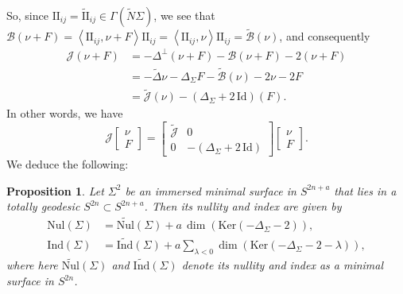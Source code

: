 \documentclass[11pt]{article}
\newcommand{\Ker}{\mathrm{Ker}}
\newtheorem{prop}[thm]{Proposition}
\theoremstyle{definition}
\numberwithin{equation}{section}
\begin{document}
So, since $\mathrm{I\!I}_{ij} = \widetilde{\mathrm{I\!I}}_{ij}  \in \Gamma(\widetilde{N}\Sigma)$, we see that $\mathscr{B}(\nu + F) = \left\langle \mathrm{I\!I}_{ij}, \nu + F \right\rangle \mathrm{I\!I}_{ij} = \left\langle \mathrm{I\!I}_{ij}, \nu \right\rangle \mathrm{I\!I}_{ij} = \widetilde{\mathscr{B}}(\nu)$, and consequently
\begin{align*}
\mathscr{J}(\nu + F) & = -\Delta^\perp (\nu + F) - \mathscr{B}(\nu + F) - 2(\nu + F) \\
& = -\widetilde{\Delta}\nu - \Delta_\Sigma F - \widetilde{\mathscr{B}}(\nu) - 2\nu - 2F \\
& = \widetilde{\mathscr{J}}(\nu) - (\Delta_\Sigma + 2\,\mathrm{Id})(F).
\end{align*}
In other words, we have
$$\mathscr{J}\!\begin{bmatrix} \nu \\ F \end{bmatrix} = \begin{bmatrix} \widetilde{\mathscr{J}} & 0 \\ 0 & -(\Delta_\Sigma + 2\,\mathrm{Id}) \end{bmatrix} \begin{bmatrix} \nu \\ F \end{bmatrix}\!.$$
We deduce the following:

\begin{prop} Let $\Sigma^2$ be an immersed minimal surface in $S^{2n+a}$ that lies in a totally geodesic $S^{2n} \subset S^{2n+a}$.  Then its nullity and index are given by
\begin{align*}
\mathrm{Nul}(\Sigma) & = \widetilde{\mathrm{Nul}}(\Sigma) + a\, \dim( \Ker(-\Delta_\Sigma-2)), \\
\mathrm{Ind}(\Sigma) & = \widetilde{\mathrm{Ind}}(\Sigma) + a \sum_{\lambda < 0} \dim( \Ker(-\Delta_\Sigma-2 - \lambda)),
\end{align*}
where here $\widetilde{\mathrm{Nul}}(\Sigma)$ and $\widetilde{\mathrm{Ind}}(\Sigma)$ denote its nullity and index as a minimal surface in $S^{2n}$.
\end{prop}
\end{document}
